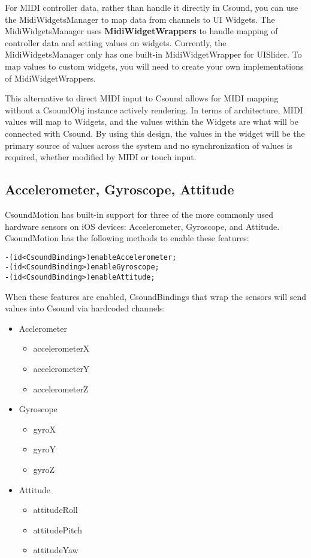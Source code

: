 \documentclass[11pt]{article}
\begin{document}
For MIDI controller data, rather than handle it directly in Csound, you can use the MidiWidgetsManager to map data from channels to UI Widgets.  The MidiWidgetsManager uses \textbf{MidiWidgetWrappers} to handle mapping of controller data and setting values on widgets.  Currently, the MidiWidgetsManager only has one built-in MidiWidgetWrapper for UISlider. To map values to custom widgets, you will need to create your own implementations of MidiWidgetWrappers.

This alternative to direct MIDI input to Csound allows for MIDI mapping without a CsoundObj instance actively rendering. In terms of architecture, MIDI values will map to Widgets, and the values within the Widgets are what will be connected with Csound.  By using this design, the values in the widget will be the primary source of values across the system and no synchronization of values is required, whether modified by MIDI or touch input.

\subsection{Accelerometer, Gyroscope, Attitude}

CsoundMotion has built-in support for three of the more commonly used hardware sensors on iOS devices: Accelerometer, Gyroscope, and Attitude. CsoundMotion has the following methods to enable these features:


\begin{lstlisting}[caption=CsoundMotion Hardware Sensor Methods]
-(id<CsoundBinding>)enableAccelerometer;
-(id<CsoundBinding>)enableGyroscope;
-(id<CsoundBinding>)enableAttitude;
\end{lstlisting}

When these features are enabled, CsoundBindings that wrap the sensors will send values into Csound via hardcoded channels:

\begin{itemize}

\item Acclerometer
\begin{itemize}
\item accelerometerX
\item accelerometerY
\item accelerometerZ
\end{itemize}

\item Gyroscope
\begin{itemize}
\item gyroX
\item gyroY
\item gyroZ
\end{itemize}

\item Attitude
\begin{itemize}
\item attitudeRoll
\item attitudePitch
\item attitudeYaw
\end{itemize}

\end{itemize}
\end{document}
